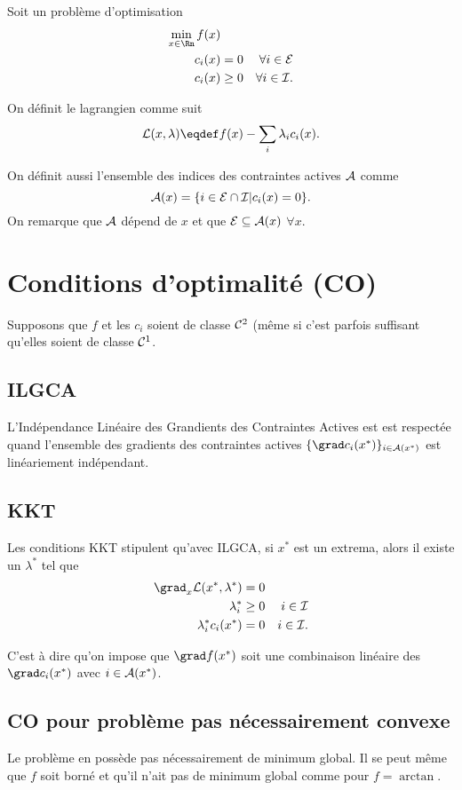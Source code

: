Soit un problème d'optimisation
\begin{align*}
  \min_{x \in \Rn} f(x)\\
  c_i(x) & = 0 & \forall i \in \eqset\\
  c_i(x) & \geq 0 & \forall i \in \inset.
\end{align*}

On définit le lagrangien comme suit
\[ \lagr(x,\lambda) \eqdef f(x) - \sum_i \lambda_i c_i(x). \]

On définit aussi l'ensemble des indices des contraintes actives $\mathcal{A}$
comme
\[ \mathcal{A}(x) = \{i \in \mathcal{E} \cap \mathcal{I} | c_i(x) = 0 \}. \]
On remarque que $\mathcal{A}$ dépend de $x$ et que $\mathcal{E} \subseteq \mathcal{A}(x)$
$\forall x$.

\section{Conditions d'optimalité (CO)}
Supposons que $f$ et les $c_i$ soient de classe $\mathcal{C}^2$
(même si c'est parfois suffisant qu'elles soient de classe $\mathcal{C}^1$.

\subsection{ILGCA}
L'Indépendance Linéaire des Grandients des Contraintes Actives est
est respectée quand l'ensemble des gradients des contraintes actives
$\{\grad c_i(x^*)\}_{i\in\acset(x^*)}$ est linéariement indépendant.

\subsection{KKT}
Les conditions KKT stipulent qu'avec ILGCA,
si $x^*$ est un extrema,
alors il existe un $\lambda^*$ tel que
\begin{align*}
  \grad_x\lagr(x^*, \lambda^*) & = 0\\
  \lambda_i^* & \geq 0 & i \in \inset\\
  \lambda_i^* c_i(x^*) & = 0 & i \in \inset.
\end{align*}

C'est à dire qu'on impose que $\grad f(x^*)$ soit une combinaison linéaire
des $\grad c_i(x^*)$ avec $i \in \mathcal{A}(x^*)$.

\subsection{CO pour problème pas nécessairement convexe}
Le problème en possède pas nécessairement de minimum global.
Il se peut même que $f$ soit borné et qu'il n'ait pas de minimum global
comme pour $f = \arctan$.

